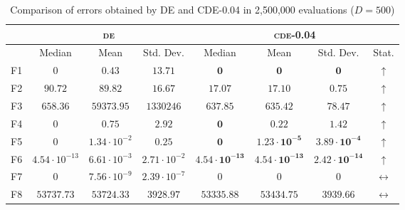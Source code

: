 \begin{table}[!t]
\caption{Comparison of errors obtained by \textsc{DE} and \textsc{CDE}-0.04 in 2,500,000 evaluations ($D = 500$)}
\label{tab:scalability_500}
\centering
\begin{scriptsize}
\begin{tabular}{c || c c c | c c c c}
\hline
 & \multicolumn{3}{|c|}{\textsc{de}} & \multicolumn{4}{|c}{\textsc{cde-0.04}} \\ \hline
    & Median                 & Mean                  & Std. Dev.             & Median                         & Mean                           & Std. Dev.                      & Stat.               \\ \hline
F1  & $0$                    & $0.43$                & $13.71$               & $\mathbf{0}$                   & $\mathbf{0}$                   & $\mathbf{0}$                   & $\uparrow$          \\ \hline
F2  & $90.72$                & $89.82$               & $16.67$               & $\mathbf{17.07}$               & $\mathbf{17.10}$               & $\mathbf{0.75}$                & $\uparrow$          \\ \hline
F3  & $658.36$               & $59373.95$            & $1330246$             & $\mathbf{637.85}$              & $\mathbf{635.42}$              & $\mathbf{78.47}$               & $\uparrow$          \\ \hline
F4  & $0$                    & $0.75$                & $2.92$                & $\mathbf{0}$                   & $\mathbf{0.22}$                & $\mathbf{1.42}$                & $\uparrow$          \\ \hline
F5  & $0$                    & $1.34 \cdot 10^{-2}$  & $0.25$                & $\mathbf{0}$                   & $\mathbf{1.23 \cdot 10^{-5}}$  & $\mathbf{3.89 \cdot 10^{-4}}$  & $\uparrow$          \\ \hline
F6  & $4.54 \cdot 10^{-13}$  & $6.61 \cdot 10^{-3}$  & $2.71 \cdot 10^{-2}$  & $\mathbf{4.54 \cdot 10^{-13}}$ & $\mathbf{4.54 \cdot 10^{-13}}$ & $\mathbf{2.42 \cdot 10^{-14}}$ & $\uparrow$          \\ \hline
F7  & $0$                    & $7.56 \cdot 10^{-9}$  & $2.39 \cdot 10^{-7}$  & $0$                            & $0$                            & $0$                            & $\leftrightarrow$   \\ \hline
F8  & $53737.73$             & $53724.33$            & $3928.97$             & $53335.88$                     & $53434.75$                     & $3939.66$                      & $\leftrightarrow$   \\ \hline

\end{tabular}
\end{scriptsize}
\end{table}
